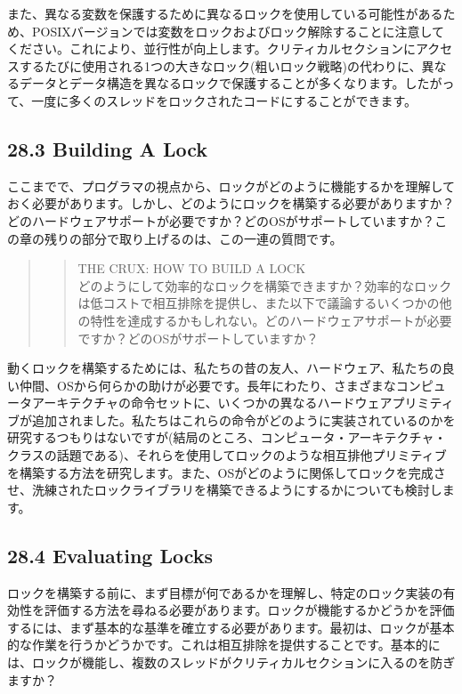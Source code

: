 また、異なる変数を保護するために異なるロックを使用している可能性があるため、POSIXバージョンでは変数をロックおよびロック解除することに注意してください。これにより、並行性が向上します。クリティカルセクションにアクセスするたびに使用される1つの大きなロック(粗いロック戦略)の代わりに、異なるデータとデータ構造を異なるロックで保護することが多くなります。したがって、一度に多くのスレッドをロックされたコードにすることができます。

\hypertarget{building-a-lock}{%
\subsection*{28.3 Building A Lock}\label{building-a-lock}}

ここまでで、プログラマの視点から、ロックがどのように機能するかを理解しておく必要があります。しかし、どのようにロックを構築する必要がありますか？どのハードウェアサポートが必要ですか？どのOSがサポートしていますか？この章の残りの部分で取り上げるのは、この一連の質問です。

\begin{quote}
\begin{quote}
THE CRUX: HOW TO BUILD A LOCK\\
どのようにして効率的なロックを構築できますか？効率的なロックは低コストで相互排除を提供し、また以下で議論するいくつかの他の特性を達成するかもしれない。どのハードウェアサポートが必要ですか？どのOSがサポートしていますか？
\end{quote}
\end{quote}

動くロックを構築するためには、私たちの昔の友人、ハードウェア、私たちの良い仲間、OSから何らかの助けが必要です。長年にわたり、さまざまなコンピュータアーキテクチャの命令セットに、いくつかの異なるハードウェアプリミティブが追加されました。私たちはこれらの命令がどのように実装されているのかを研究するつもりはないですが(結局のところ、コンピュータ・アーキテクチャ・クラスの話題である)、それらを使用してロックのような相互排他プリミティブを構築する方法を研究します。また、OSがどのように関係してロックを完成させ、洗練されたロックライブラリを構築できるようにするかについても検討します。

\hypertarget{evaluating-locks}{%
\subsection*{28.4 Evaluating Locks}\label{evaluating-locks}}

ロックを構築する前に、まず目標が何であるかを理解し、特定のロック実装の有効性を評価する方法を尋ねる必要があります。ロックが機能するかどうかを評価するには、まず基本的な基準を確立する必要があります。最初は、ロックが基本的な作業を行うかどうかです。これは相互排除を提供することです。基本的には、ロックが機能し、複数のスレッドがクリティカルセクションに入るのを防ぎますか？

